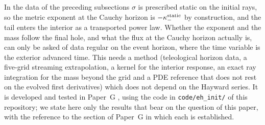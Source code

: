 \documentclass[11pt]{article}
\begin{document}
In the data of the preceding subsections $\sigma$ is prescribed static on the initial rays, so the metric exponent at the Cauchy horizon is $-\kappa_-^{\rm static}$ by construction, and the tail enters the interior as a transported power law. Whether the exponent and the mass follow the final hole, and what the flux at the Cauchy horizon actually is, can only be asked of data regular on the event horizon, where the time variable is the exterior advanced time. This needs a method (teleological horizon data, a five-grid streaming extrapolation, a kernel for the interior response, an exact ray integration for the mass beyond the grid and a PDE reference that does not rest on the evolved first derivatives) which does not depend on the Hayward series. It is developed and tested in Paper~G \citep{PaperG}, using the code in \texttt{code/eh\_init/} of this repository; we state here only the results that bear on the question of this paper, with the reference to the section of Paper~G in which each is established.
\end{document}
